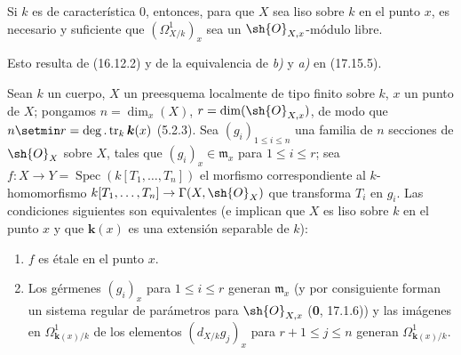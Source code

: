 \begin{corollary}[17.15.7]
\label{IV.17.15.7}
Si $k$ es de característica \textup{0}, entonces, para que $X$ sea liso sobre $k$ en el punto $x$, es necesario y suficiente que $(\varOmega^1_{X/k})_x$ sea un $\sh{O}_{X,x}$-módulo libre.
\end{corollary}

Esto resulta de (16.12.2) y de la equivalencia de \emph{b)} y \emph{a)} en (17.15.5).

\begin{proposition}[17.15.8]
\label{IV.17.15.8}
Sean $k$ un cuerpo, $X$ un preesquema localmente de tipo finito sobre $k$, $x$ un punto de $X$; pongamos $n=\dim_x(X)$, $r=\dim(\sh{O}_{X,x})$, de modo que $n\setmin r=\deg.\operatorname{tr}_k \boldsymbol k(x)$ \textup{(5.2.3)}. Sea $(g_i)_{1\leq i\leq n}$ una familia de $n$ secciones de $\sh{O}_X$ sobre $X$, tales que $(g_i)_x\in\mathfrak m_x$ para $1\leq i\leq r$; sea $f:X\to Y=\operatorname{Spec}(k[T_1,\ldots,T_n])$ el morfismo correspondiente al $k$-homomorfismo $k[T_1,\ldots,T_n]\to\Gamma(X,\sh{O}_X)$ que transforma $T_i$ en $g_i$. Las condiciones siguientes son equivalentes (e implican que $X$ es liso sobre $k$ en el punto $x$ y que $\boldsymbol k(x)$ es una extensión separable de $k$):
\begin{enumerate}
  \item[\textup{a)}] $f$ es étale en el punto $x$.


  \item[\textup{b)}] Los gérmenes $(g_i)_x$ para $1\leq i\leq r$ generan $\mathfrak m_x$ \textup{(y por consiguiente forman un sistema regular de parámetros para $\sh{O}_{X,x}$ (\textbf 0, 17.1.6))} y las imágenes en $\Omega^1_{\mathbf k(x)/k}$ de los elementos $(d_{X/k}g_j)_x$ para $r+1\leq j\leq n$ generan $\Omega^1_{\mathbf k(x)/k}$.
\end{enumerate}
\end{proposition}

